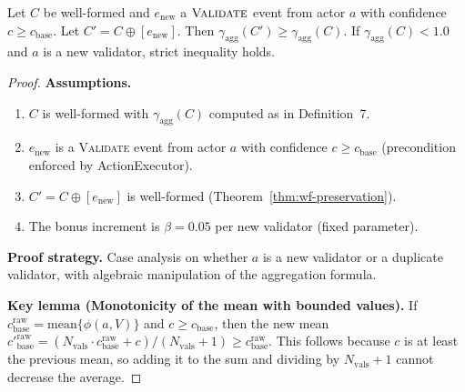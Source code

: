\begin{theorem}\label{thm:monotonicity-confidence}
Let $C$ be well-formed and $e_{\text{new}}$ a $\textsc{Validate}$ event from actor $a$ with confidence $c \geq c_{\text{base}}$. Let $C' = C \oplus [e_{\text{new}}]$. Then $\gamma_{\text{agg}}(C') \geq \gamma_{\text{agg}}(C)$. If $\gamma_{\text{agg}}(C) < 1.0$ and $a$ is a new validator, strict inequality holds.
\end{theorem}

\begin{proof}
\textbf{Assumptions.}
\begin{enumerate}[label=(A\arabic*),leftmargin=2em]
    \item $C$ is well-formed with $\gamma_{\text{agg}}(C)$ computed as in Definition~7.
    \item $e_{\text{new}}$ is a \textsc{Validate} event from actor $a$ with confidence $c \geq c_{\text{base}}$ (precondition enforced by ActionExecutor).
    \item $C' = C \oplus [e_{\text{new}}]$ is well-formed (Theorem~\ref{thm:wf-preservation}).
    \item The bonus increment is $\beta = 0.05$ per new validator (fixed parameter).
\end{enumerate}

\textbf{Proof strategy.} Case analysis on whether $a$ is a new validator or a duplicate validator, with algebraic manipulation of the aggregation formula.

\textbf{Key lemma (Monotonicity of the mean with bounded values).} If $c_{\text{base}}^{\text{raw}} = \text{mean}\{\phi(a, V)\}$ and $c \geq c_{\text{base}}$, then the new mean $c'^{\text{raw}}_{\text{base}} = (N_{\text{vals}} \cdot c_{\text{base}}^{\text{raw}} + c) / (N_{\text{vals}} + 1) \geq c_{\text{base}}^{\text{raw}}$. This follows because $c$ is at least the previous mean, so adding it to the sum and dividing by $N_{\text{vals}} + 1$ cannot decrease the average.


\end{proof}
